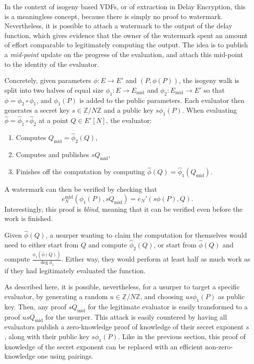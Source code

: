\documentclass{llncs}
\newcommand{\Z}{\mathbb{Z}}
\newcommand{\Emid}{E_\mathrm{mid}}
\newcommand{\Qmid}{Q_\mathrm{mid}}
\begin{document}
In the context of isogeny based VDFs, or of extraction in Delay
Encryption, this is a meaningless concept, because there is simply no
proof to watermark. %
Nevertheless, it is possible to attach a watermark to the output of
the delay function, which gives evidence that the owner of the
watermark spent an amount of effort comparable to legitimately
computing the output. %
The idea is to publish a \emph{mid-point} update on the progress of
the evaluation, and attach this mid-point to the identity of the
evaluator.

Concretely, given parameters $\phi:E\to E'$ and $(P,\phi(P))$, the
isogeny walk is split into two halves of equal size
$\phi_1:E\to \Emid$ and $\phi_2:\Emid\to E'$ so that
$\phi=\phi_2\circ\phi_1$, and $\phi_1(P)$ is added to the public parameters. %
Each evaluator then generates a secret key $s\in\Z/N\Z$ and a public
key $s\phi_1(P)$. %
When evaluating $\hat\phi=\hat\phi_1\circ\hat\phi_2$ at a point
$Q\in E'[N]$, the evaluator:
\begin{enumerate}
\item Computes $\Qmid=\hat\phi_2(Q)$,
\item Computes and publishes $s\Qmid$,
\item Finishes off the computation by computing
  $\hat\phi(Q)=\hat\phi_1(\Qmid)$.
\end{enumerate}
A watermark can then be verified by checking that
\[e_N^\mathrm{mid}(\phi_1(P),s\Qmid) = e_N'(s\phi(P),Q).\]
Interestingly, this proof is \emph{blind}, meaning that it can be
verified even before the work is finished.

Given $\hat\phi(Q)$, a usurper wanting to claim the computation for
themselves would need to either start from $Q$ and compute
$\hat\phi_2(Q)$, or start from $\hat\phi(Q)$ and compute
$\frac{\phi_1(\hat\phi(Q))}{\deg\phi_1}$. %
Either way, they would perform at least half as much work as if they
had legitimately evaluated the function.

As described here, it is possible, nevertheless, for a usurper to
target a specific evaluator, by generating a random $u\in\Z/N\Z$, and
choosing $us\phi_1(P)$ as public key. %
Then, any proof $s\Qmid$ for the legitimate evaluator is easily
transformed to a proof $us\Qmid$ for the usurper. %
This attack is easily countered by having all evaluators publish a
zero-knowledge proof of knowledge of their secret exponent $s$, along
with their public key $s\phi_1(P)$. %
Like in the previous section, this proof of knowledge of the secret
exponent can be replaced with an efficient non-zero-knowledge one
using pairings.
\end{document}

